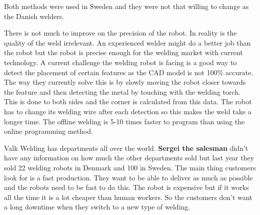 Both methods were used in Sweden and they were not that willing to change as the Danish welders.

There is not much to improve on the precision of the robot.
In reality is the quality of the weld irrelevant. 
An experienced welder might do a better job than the robot but the robot is precise enough for the welding market with current technology.
A current challenge the welding robot is facing is a good way to detect the placement of certain features as the CAD model is not 100\% accurate.
The way they currently solve this is by slowly moving the robot closer towards the feature and then detecting the metal by touching with the welding torch. 
This is done to both sides and the corner is calculated from this data.
The robot has to change its welding wire after each detection so this makes the weld take a longer time.
The offline welding is 5-10 times faster to program than using the online programming method. 

Valk Welding has departments all over the world. 
\textbf{Sergei the salesman} didn't have any information on how much the other departments sold but last year they sold 22 welding robots in Denmark and 100 in Sweden.
The main thing customers look for is a fast production.
They want to be able to deliver as much as possible and the robots need to be fast to do this.
The robot is expensive but if it works all the time it is a lot cheaper than human workers.
So the customers don't want a long downtime when they switch to a new type of welding.


